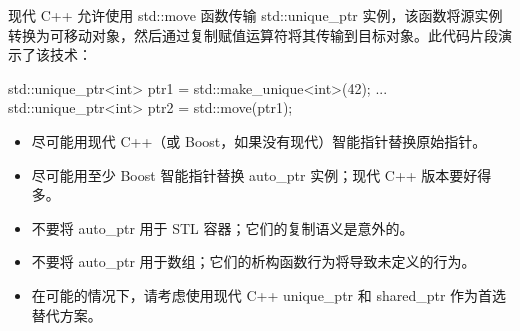 现代 C++ 允许使用 std::move 函数传输 std::unique\_ptr 实例，该函数将源实例转换为可移动对象，然后通过复制赋值运算符将其传输到目标对象。此代码片段演示了该技术：

\begin{cpp}
std::unique_ptr<int> ptr1 = std::make_unique<int>(42);
...
std::unique_ptr<int> ptr2 = std::move(ptr1);
\end{cpp}


\begin{itemize}
\item
尽可能用现代 C++（或 Boost，如果没有现代）智能指针替换原始指针。

\item
尽可能用至少 Boost 智能指针替换 auto\_ptr 实例；现代 C++ 版本要好得多。

\item
不要将 auto\_ptr 用于 STL 容器；它们的复制语义是意外的。

\item
不要将 auto\_ptr 用于数组；它们的析构函数行为将导致未定义的行为。

\item
在可能的情况下，请考虑使用现代 C++ unique\_ptr 和 shared\_ptr 作为首选替代方案。
\end{itemize}






















